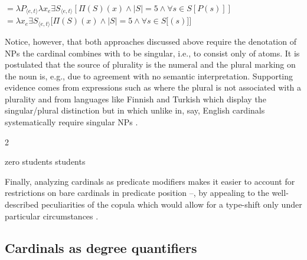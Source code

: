 \documentclass[output=paper]{langscibook}
\begin{document}
\ea \ea {} $=\lambda P_{\langle e,t\rangle} \lambda x_e\exists S_{\langle e,t\rangle}[\Pi(S)(x) \wedge |S|=5 \wedge \forall s \in S [P(s)]]$\label{ex:five-modifier-im}
\ex {} $=\lambda x_e\exists S_{\langle e,t\rangle}[\Pi(S)(x) \wedge |S|=5 \wedge \forall s \in S [$$(s)]]$\label{ex:five-cats-modifier-im}
\z
\z

\noindent Notice, however, that both approaches discussed above require the denotation of NPs the cardinal combines with to be singular, i.e., to consist only of atoms. It is postulated that the source of plurality is the numeral and the plural marking on the noun is, e.g., due to agreement with no semantic interpretation. Supporting evidence comes from expressions such as  where the plural is not associated with a plurality \citep{Krifka1989,bylinina_nouwen2018zero} and from languages like Finnish and Turkish which display the singular/plural distinction but in which unlike in, say, English cardinals systematically require singular NPs . 

\vspace{-0.5ex}

\begin{multicols}{2}

	\ea\label{ex:zero-1.0} \ea zero students\label{ex:zero}
	 students\label{ex:1.0}\\{\phantom{\_}}
	\z
	\z

\columnbreak

	\label{ex:turkish-singular}
	\z

\end{multicols}

\vspace{-1.0ex}

\noindent Finally, analyzing cardinals as predicate modifiers makes it easier to account for restrictions on bare cardinals in predicate position --, by appealing to the well-described peculiarities of the copula which would allow for a type-shift only under particular circumstances \citep[33--34]{ionin_matushansky2018cardinals}. 

	\subsection{Cardinals as degree quantifiers}\label{sec:cardinals-as-degree-quantifiers}
	
\end{document}
